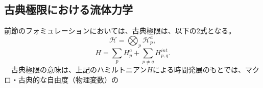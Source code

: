\subsection{古典極限における流体力学}
前節のフォミュレーションにおいては、古典極限は、以下の2式となる。
\begin{equation}
    \mathcal{H} = \bigotimes_p \mathcal{H}_p^a,
\end{equation}
\begin{equation}
H=\sum_pH_p^a+ \sum_{p \neq q} H^{int}_{p,q}.
\end{equation}
　古典極限の意味は、上記のハミルトニアン$H$による時間発展のもとでは、マクロ・古典的な自由度（物理変数）の
